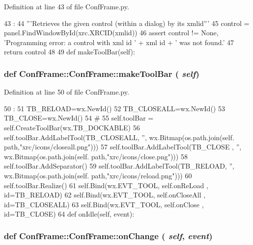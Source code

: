 Definition at line 43 of file ConfFrame.py.


\begin{DoxyCode}
43                                       :
44         '''Retrieves the given control (within a dialog) by its xmlid'''
45         control = panel.FindWindowById(xrc.XRCID(xmlid))
46         assert control != None, 'Programming error: a control with xml id ' + xml
      id + ' was not found.'
47         return control
48 
49         
    def makeToolBar(self):
\end{DoxyCode}
\hypertarget{classConfFrame_1_1ConfFrame_a1908e2575a1d99499a5769a381f4180e}{
\subsubsection[{makeToolBar}]{\setlength{\rightskip}{0pt plus 5cm}def ConfFrame::ConfFrame::makeToolBar ( {\em self})}}
\label{classConfFrame_1_1ConfFrame_a1908e2575a1d99499a5769a381f4180e}


Definition at line 50 of file ConfFrame.py.


\begin{DoxyCode}
50                          :
51         TB_RELOAD=wx.NewId()
52         TB_CLOSEALL=wx.NewId()
53         TB_CLOSE=wx.NewId()
54         #
55         self.toolBar = self.CreateToolBar(wx.TB_DOCKABLE)
56         self.toolBar.AddLabelTool(TB_CLOSEALL, '', wx.Bitmap(os.path.join(self.
      path,"xrc/icons/closeall.png")))
57         self.toolBar.AddLabelTool(TB_CLOSE  , '', wx.Bitmap(os.path.join(self.
      path,"xrc/icons/close.png")))
58         self.toolBar.AddSeparator()        
59         self.toolBar.AddLabelTool(TB_RELOAD, '', wx.Bitmap(os.path.join(self.
      path,"xrc/icons/reload.png")))
60         self.toolBar.Realize()
61         self.Bind(wx.EVT_TOOL, self.onReLoad , id=TB_RELOAD)
62         self.Bind(wx.EVT_TOOL, self.onCloseAll , id=TB_CLOSEALL)
63         self.Bind(wx.EVT_TOOL, self.onClose , id=TB_CLOSE)
64 
    def onIdle(self, event):
\end{DoxyCode}
\hypertarget{classConfFrame_1_1ConfFrame_ad9099fca804e54f6a2f0423fe9a1cd62}{
\subsubsection[{onChange}]{\setlength{\rightskip}{0pt plus 5cm}def ConfFrame::ConfFrame::onChange ( {\em self}, \/   {\em event})}}
\label{classConfFrame_1_1ConfFrame_ad9099fca804e54f6a2f0423fe9a1cd62}


